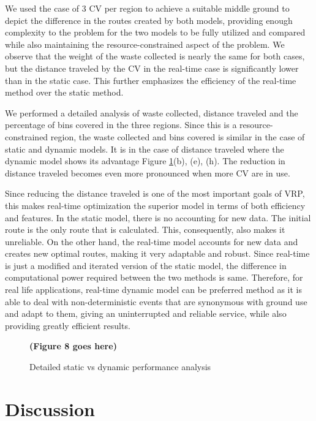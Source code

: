 \documentclass[12pt]{article}
\begin{document}
We used the case of 3 CV per region to achieve a suitable middle ground to depict the difference in the routes created by both models, providing enough complexity to the problem for the two models to be fully utilized and compared while also maintaining the resource-constrained aspect of the problem. We observe that the weight of the waste collected is nearly the same for both cases, but the distance traveled by the CV in the real-time case is significantly lower than in the static case. This further emphasizes the efficiency of the real-time method over the static method.

We performed a detailed analysis of waste collected, distance traveled and the percentage of bins covered in the three regions. Since this is a resource-constrained region, the waste collected and bins covered is similar in the case of static and dynamic models. It is in the case of distance traveled where the dynamic model shows its advantage {Figure \ref{figcg1}(b), (e), (h)}. The reduction in distance traveled becomes even more pronounced when more CV are in use.

Since reducing the distance traveled is one of the most important goals of VRP, this makes real-time optimization the superior model in terms of both efficiency and features. In the static model, there is no accounting for new data. The initial route is the only route that is calculated. This, consequently, also makes it unreliable. On the other hand, the real-time model accounts for new data and creates new optimal routes, making it very adaptable and robust. Since real-time is just a modified and iterated version of the static model, the difference in computational power required between the two methods is same. Therefore, for real life applications, real-time dynamic model can be preferred method as it is able to deal with non-deterministic events that are synonymous with ground use and adapt to them, giving an uninterrupted and reliable service, while also providing greatly efficient results.

\begin{figure}[H]
	\centering
    \textbf{(Figure 8 goes here)}\label{ABCD}
	\caption{Detailed static vs dynamic performance analysis}\label{figcg1}
\end{figure}

\section{Discussion}
\end{document}
